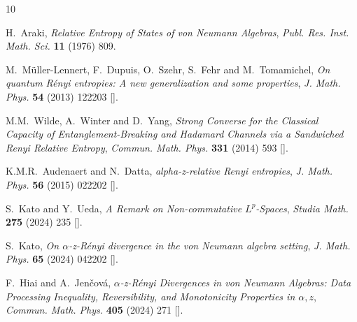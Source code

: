 \documentclass[12pt]{article}
\numberwithin{equation}{section}
\theoremstyle{definition}
\theoremstyle{remark}
\newcommand{\?}{\overset{?}{=}}
\begin{document}
\providecommand{\href}[2]{#2}\begingroup\raggedright\begin{thebibliography}{10}

H.~Araki, \emph{{Relative Entropy of States of von Neumann Algebras}},
  \href{https://doi.org/10.2977/prims/1195191148}{\emph{Publ. Res. Inst. Math.
  Sci.} {\bfseries 11} (1976) 809}.

M.~M{\"u}ller-Lennert, F.~Dupuis, O.~Szehr, S.~Fehr and M.~Tomamichel,
  \emph{{On quantum R{\'e}nyi entropies: A new generalization and some
  properties}}, \href{https://doi.org/10.1063/1.4838856}{\emph{J. Math. Phys.}
  {\bfseries 54} (2013) 122203}
  [\href{https://arxiv.org/abs/1306.3142}{{}}].

M.M.~Wilde, A.~Winter and D.~Yang, \emph{{Strong Converse for the Classical
  Capacity of Entanglement-Breaking and Hadamard Channels via a Sandwiched
  Renyi Relative Entropy}},
  \href{https://doi.org/10.1007/s00220-014-2122-x}{\emph{Commun. Math. Phys.}
  {\bfseries 331} (2014) 593}
  [\href{https://arxiv.org/abs/1306.1586}{{}}].

K.M.R.~Audenaert and N.~Datta, \emph{{alpha-z-relative Renyi entropies}},
  \href{https://doi.org/10.1063/1.4906367}{\emph{J. Math. Phys.} {\bfseries 56}
  (2015) 022202} [\href{https://arxiv.org/abs/1310.7178}{{}}].

S.~Kato and Y.~Ueda, \emph{{A Remark on Non-commutative $L^p$-Spaces}},
  \href{https://doi.org/10.4064/sm230724-11-10}{\emph{Studia Math.} {\bfseries
  275} (2024) 235} [\href{https://arxiv.org/abs/2307.01790}{{}}].

S.~Kato, \emph{{On {\ensuremath{\alpha}}-z-R{\'e}nyi divergence in the von
  Neumann algebra setting}}, \href{https://doi.org/10.1063/5.0186552}{\emph{J.
  Math. Phys.} {\bfseries 65} (2024) 042202}
  [\href{https://arxiv.org/abs/2311.01748}{{}}].

F.~Hiai and A.~Jen{\v{c}}ov{\'a}, \emph{{$\alpha $-z-R{\'e}nyi Divergences in
  von Neumann Algebras: Data Processing Inequality, Reversibility, and
  Monotonicity Properties in $\alpha ,z$}},
  \href{https://doi.org/10.1007/s00220-024-05124-1}{\emph{Commun. Math. Phys.}
  {\bfseries 405} (2024) 271}
  [\href{https://arxiv.org/abs/2404.07617}{{}}].


\end{thebibliography}
\end{document}
